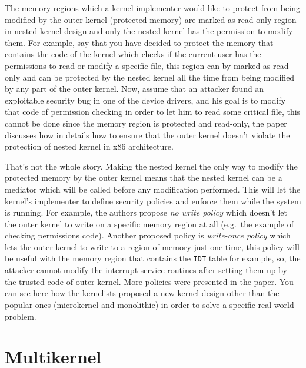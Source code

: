 The memory regions which a kernel implementer would like to protect from
being modified by the outer kernel (protected memory) are marked as
read-only region in nested kernel design and only the nested kernel has
the permission to modify them. For example, say that you have decided to
protect the memory that contains the code of the kernel which checks if
the current user has the permissions to read or modify a specific file,
this region can by marked as read-only and can be protected by the
nested kernel all the time from being modified by any part of the outer
kernel. Now, assume that an attacker found an exploitable security bug
in one of the device drivers, and his goal is to modify that code of
permission checking in order to let him to read some critical file, this
cannot be done since the memory region is protected and read-only, the
paper discusses how in details how to ensure that the outer kernel
doesn't violate the protection of nested kernel in x86 architecture.

That's not the whole story. Making the nested kernel the only way to
modify the protected memory by the outer kernel means that the nested
kernel can be a mediator which will be called before any modification
performed. This will let the kernel's implementer to define security
policies and enforce them while the system is running. For example, the
authors propose \emph{no write policy} which doesn't let the outer
kernel to write on a specific memory region at all (e.g.~the example of
checking permissions code). Another proposed policy is \emph{write-once
policy} which lets the outer kernel to write to a region of memory just
one time, this policy will be useful with the memory region that
contains the \lstinline!IDT! table for example, so, the attacker cannot
modify the interrupt service routines after setting them up by the
trusted code of outer kernel. More policies were presented in the paper.
You can see here how the kernelists proposed a new kernel design other
than the popular ones (microkernel and monolithic) in order to solve a
specific real-world problem.

\section{Multikernel}\label{multikernel}

